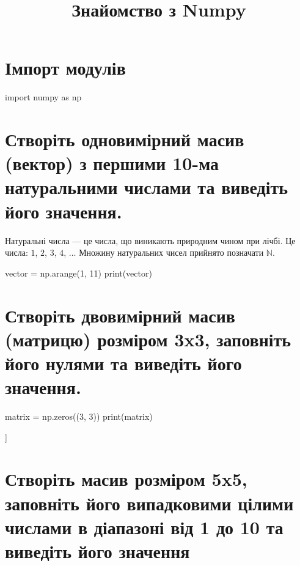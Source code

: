 \documentclass[]{article}
\title{Знайомство з Numpy}
\newcounter{pythoncode}
\begin{document}
\maketitle





\section*{Імпорт модулів}


\begin{pythoncode}
	import numpy as np
\end{pythoncode}





\section{Створіть одновимірний масив (вектор) з першими 10-ма
  натуральними числами та виведіть його значення.}

Натуральні числа --- це числа, що виникають природним чином при лічбі.
Це числа: \(1\), \(2\), \(3\), \(4\), \(\ldots\) Множину натуральних
чисел прийнято позначати \(\mathbb{N}\).


\begin{pythoncode}
	vector = np.arange(1, 11)
	print(vector)
\end{pythoncode}


\begin{out}
[ 1  2  3  4  5  6  7  8  9 10]
\end{out}

\section{Створіть двовимірний масив (матрицю) розміром 3x3,
  заповніть його нулями та виведіть його
  значення.}

\begin{pythoncode}
	matrix = np.zeros((3, 3))
	print(matrix)
\end{pythoncode}

\begin{out}
[[0. 0. 0.]
 [0. 0. 0.]
 [0. 0. 0.]]
\end{out}

\section{Створіть масив розміром 5x5, заповніть його випадковими цілими числами в діапазоні від 1 до 10 та виведіть його значення}
\end{document}
